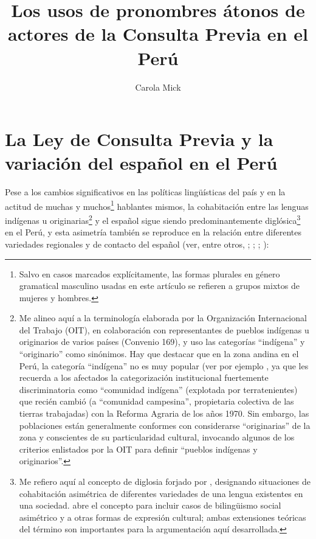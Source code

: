 \documentclass[output=paper]{../langscibook}
\author{Carola Mick\orcid{0000-0003-0923-1211}\affiliation{Université de Paris}}
\title{Los usos de pronombres átonos de actores de la Consulta Previa en el Perú}
\begin{document}
\maketitle 





\section{La Ley de Consulta Previa y la variación del español en el Perú}\label{sec:mick:1}

Pese a los cambios significativos en las políticas lingüísticas del país y en la actitud de muchas y muchos\footnote{Salvo en casos marcados explícitamente, las formas plurales en género gramatical masculino usadas en este artículo se refieren a grupos mixtos de mujeres y hombres.} hablantes mismos, la cohabitación entre las lenguas indígenas u originarias\footnote{\label{fn:mick:2}Me alineo aquí a la terminología elaborada por la Organización Internacional del Trabajo (OIT), en colaboración con representantes de pueblos indígenas u originarios de varios países (Convenio 169), y uso las categorías “indígena” y “originario” como sinónimos. Hay que destacar que en la zona andina en el Perú, la categoría “indígena” no es muy popular (ver por ejemplo \citet{Rousseau2012}, ya que les recuerda a los afectados la categorización institucional fuertemente discriminatoria como “comunidad indígena” (explotada por terratenientes) que recién cambió (a “comunidad campesina”, propietaria colectiva de las tierras trabajadas) con la Reforma Agraria de los años 1970. Sin embargo, las poblaciones están generalmente conformes con considerarse “originarias” de la zona y conscientes de su particularidad cultural, invocando algunos de los criterios enlistados por la OIT para definir “pueblos indígenas y originarios”.} y el español sigue siendo predominantemente diglósica\footnote{Me refiero aquí al concepto de diglosia forjado por \citet{Ferguson1959}, designando situaciones de cohabitación asimétrica de diferentes variedades de una lengua existentes en una sociedad. \citet{Fishman1972} abre el concepto para incluir casos de bilingüismo social asimétrico y \citet{Lienhard1996} a otras formas de expresión cultural; ambas extensiones teóricas del término son importantes para la argumentación aquí desarrollada.} en el Perú, y esta asimetría también se reproduce en la relación entre diferentes variedades regionales y de contacto del español (ver, entre otros, \citealt{Escobar1978}; \citealt{Cerrón-Palomino1987}; \citealt{Gugenberger1994}; \citealt{TubinoZariquiey2007}):
\end{document}
